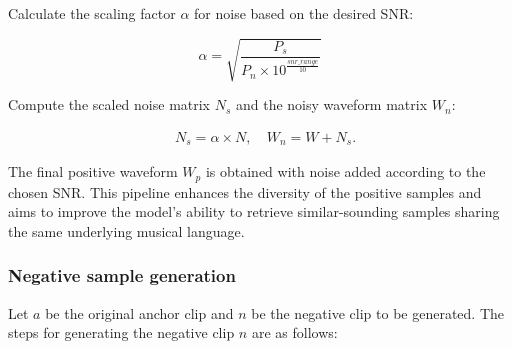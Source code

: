 Calculate the scaling factor $\alpha$ for noise based on the desired SNR:

\[
\alpha = \sqrt{\frac{P_s}{P_n \times 10^{\frac{snr\_range}{10}}}}
\]

Compute the scaled noise matrix $N_s$ and the noisy waveform matrix $W_n$:

\begin{align*}
&N_s = \alpha \times N, \
&W_n = W + N_s.
\end{align*}

The final positive waveform $W_p$ is obtained with noise added according to the chosen SNR. This pipeline enhances the diversity of the positive samples and aims to improve the model's ability to retrieve similar-sounding samples sharing the same underlying musical language.

\subsubsection{Negative sample generation}

Let $a$ be the original anchor clip and $n$ be the negative clip to be generated. The steps for generating the negative clip $n$ are as follows:

